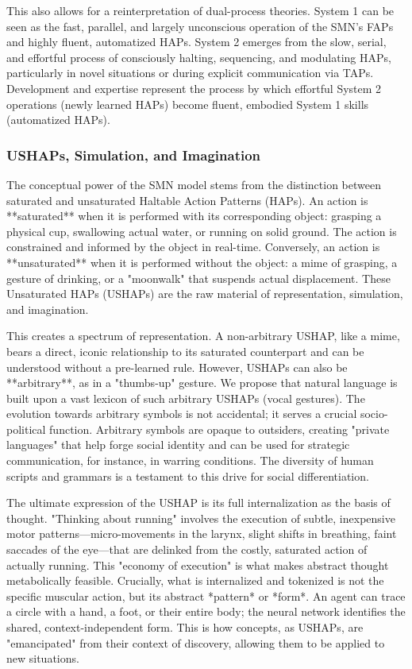 This also allows for a reinterpretation of dual-process theories. System 1 can be seen as the fast, parallel, and largely unconscious operation of the SMN's FAPs and highly fluent, automatized HAPs. System 2 emerges from the slow, serial, and effortful process of consciously halting, sequencing, and modulating HAPs, particularly in novel situations or during explicit communication via TAPs. Development and expertise represent the process by which effortful System 2 operations (newly learned HAPs) become fluent, embodied System 1 skills (automatized HAPs).

\subsubsection{USHAPs, Simulation, and Imagination}
\label{ssubsec:ushaps}
The conceptual power of the SMN model stems from the distinction between saturated and unsaturated Haltable Action Patterns (HAPs). An action is **saturated** when it is performed with its corresponding object: grasping a physical cup, swallowing actual water, or running on solid ground. The action is constrained and informed by the object in real-time. Conversely, an action is **unsaturated** when it is performed without the object: a mime of grasping, a gesture of drinking, or a "moonwalk" that suspends actual displacement. These Unsaturated HAPs (USHAPs) are the raw material of representation, simulation, and imagination.

This creates a spectrum of representation. A non-arbitrary USHAP, like a mime, bears a direct, iconic relationship to its saturated counterpart and can be understood without a pre-learned rule. However, USHAPs can also be **arbitrary**, as in a "thumbs-up" gesture. We propose that natural language is built upon a vast lexicon of such arbitrary USHAPs (vocal gestures). The evolution towards arbitrary symbols is not accidental; it serves a crucial socio-political function. Arbitrary symbols are opaque to outsiders, creating "private languages" that help forge social identity and can be used for strategic communication, for instance, in warring conditions. The diversity of human scripts and grammars is a testament to this drive for social differentiation.

The ultimate expression of the USHAP is its full internalization as the basis of thought. "Thinking about running" involves the execution of subtle, inexpensive motor patterns—micro-movements in the larynx, slight shifts in breathing, faint saccades of the eye—that are delinked from the costly, saturated action of actually running. This "economy of execution" is what makes abstract thought metabolically feasible. Crucially, what is internalized and tokenized is not the specific muscular action, but its abstract *pattern* or *form*. An agent can trace a circle with a hand, a foot, or their entire body; the neural network identifies the shared, context-independent form. This is how concepts, as USHAPs, are "emancipated" from their context of discovery, allowing them to be applied to new situations.

